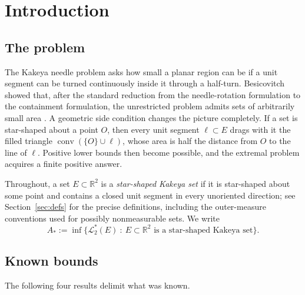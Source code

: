 \documentclass[11pt]{article}
\theoremstyle{plain}
\theoremstyle{definition}
\theoremstyle{remark}
\newcommand{\R}{\mathbb{R}}
\newcommand{\Lout}{\mathcal{L}^{*}_{2}}
\newcommand{\Astar}{A_{*}}
\newcommand{\conv}{\operatorname{conv}}
\begin{document}
\tableofcontents

\section{Introduction}\label{sec:intro}

\subsection{The problem}

The Kakeya needle problem asks how small a planar region can be if a unit
segment can be turned continuously inside it through a half-turn. Besicovitch
showed that, after the standard reduction from the needle-rotation formulation
to the containment formulation, the unrestricted problem admits sets of
arbitrarily small area \cite{Besicovitch1928}. A geometric side condition
changes the picture completely. If a set is star-shaped about a point $O$, then
every unit segment $\ell\subset E$ drags with it the filled triangle
$\conv(\{O\}\cup\ell)$, whose area is half the distance from $O$ to the line of
$\ell$. Positive lower bounds then become possible, and the extremal problem
acquires a finite positive answer.

Throughout, a set $E\subset\R^{2}$ is a \emph{star-shaped Kakeya set} if it is
star-shaped about some point and contains a closed unit segment in every
unoriented direction; see Section~\ref{sec:defs} for the precise definitions,
including the outer-measure conventions used for possibly nonmeasurable sets.
We write
\[
  \Astar:=\inf\bigl\{\Lout(E)\ :\ E\subset\R^{2}
  \text{ is a star-shaped Kakeya set}\bigr\}.
\]

\subsection{Known bounds}

The following four results delimit what was known.
\end{document}
